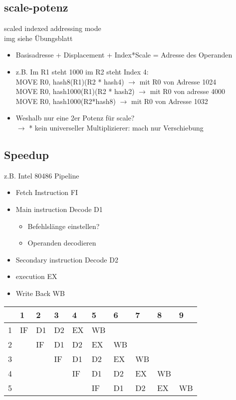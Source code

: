 \subsection{scale-potenz}
scaled indexed addressing mode \\
img siehe Übungsblatt
\begin{itemize}
	\item Basisadresse + Displacement + Index*Scale = Adresse des Operanden
	\item z.B. Im R1 steht 1000 im R2 steht Index 4:\\
	MOVE R0, hash8(R1)(R2 * hash4) \(\to\) mit R0 von Adresse 1024\\
	MOVE R0, hash1000(R1)(R2 * hash2) \(\to\) mit R0 von adresse 4000\\
	MOVE R0, hash1000(R2*hash8) \(\to\) mit R0 von Adresse 1032
	\item Weshalb nur eine 2er Potenz für scale?\\
	\(\to\) * kein universeller Multiplizierer: mach nur Verschiebung
\end{itemize}
\subsection{Speedup}
z.B. Intel 80486 Pipeline
\begin{itemize}
	\item Fetch Instruction FI
	\item Main instruction Decode D1
	\begin{itemize}
		\item Befehlslänge einstellen?
		\item Operanden decodieren
	\end{itemize}
	\item Secondary instruction Decode D2
	\item execution EX
	\item Write Back WB
\end{itemize}
\begin{tabularx}{\textwidth}{|X|X|X|X|X|X|X|X|X|X|}
\hline
	&1&2&3&4&5&6&7&8&9\\
\hline
1 & IF & D1 & D2 & EX & WB &&&&\\
\hline
2 && IF & D1 & D2 & EX & WB &&& \\
\hline
3 &&& IF & D1 & D2 & EX & WB && \\
\hline
4 &&&& IF & D1 & D2 & EX & WB &\\
\hline
5 &&&&& IF & D1 & D2 & EX & WB \\
\hline
\end{tabularx}

